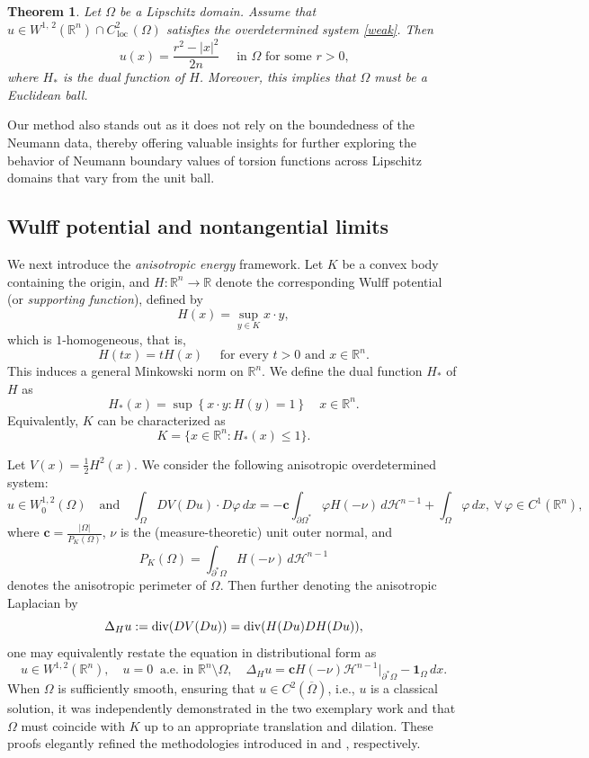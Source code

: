 \documentclass[reqno,11pt]{amsart}
\def\loc{{\mathop\mathrm{\,loc\,}}}
\newcommand{\R}{\mathbb{R}}
\newtheorem{thm}{Theorem}[section]
\numberwithin{equation}{section}
\theoremstyle{remark}
\begin{document}
\begin{thm}\label{main thm}
    Let $\Omega$ be a Lipschitz domain. 
    Assume that $u\in W^{1,\,2}(\mathbb R^n)\cap C^2_\loc(\Omega)$ satisfies the overdetermined system \eqref{weak}. Then 
    $$u(x)=\frac{r^2-|x|^2}{2n} \quad \text{ in  }  \Omega  \text{ for some $r>0$,}$$
where $H_*$ is the dual function of $H$. Moreover, this implies that $\Omega$ must be a Euclidean ball. 
\end{thm}

Our method also stands out as it does not rely on the boundedness of the Neumann data, thereby offering valuable insights for further exploring the behavior of Neumann boundary values of torsion functions across Lipschitz domains that vary from the unit ball. 

\subsection{Wulff potential and nontangential limits}

We next introduce the \emph{anisotropic energy} framework. Let $K$ be  a convex body containing the origin, and  $H\colon \mathbb R^n\to \mathbb R$ denote the corresponding Wulff potential (or \emph{supporting function}), defined by 
$$H(x)=\sup_{y\in K} x\cdot y,$$
which is $1$-homogeneous, that is,
$$H(tx)=tH(x)\quad \text{  for every $t>0$ and $x\in \mathbb R^n$} .$$
This induces a general Minkowski norm on $\mathbb R^n$. We define the dual function $H_*$ of $H$ as
$$H_*(x)= \sup\left\{x \cdot y : H(y) = 1\right\}\quad  x\in \mathbb R^n.$$
Equivalently,  $K$ can be characterized as
$$K=\{x\in \mathbb R^n\colon H_*(x)\le 1\}. $$


Let $V(x)=\frac 1 2 H^2(x)$.  We consider the following anisotropic overdetermined system:
\begin{equation*}
     u \in W^{1,2}_0(\Omega) \quad \text{and} \quad \int_{\Omega} DV(Du)\cdot D\varphi \, dx = -\mathbf{c}\int_{\partial \Omega^*} \varphi H(-\nu)\, d\mathscr{H}^{n-1} + \int_{\Omega} \varphi \, dx, \  \forall\, \varphi\in C^1(\mathbb{R}^n),
\end{equation*}
where $\mathbf c=\frac{|\Omega|}{P_K(\Omega)}$, $\nu$ is the (measure-theoretic) unit outer normal, and $$P_K(\Omega)=\int_{\partial^*\Omega} H(-\nu)\, d\mathscr H^{n-1}$$
denotes the anisotropic perimeter of $\Omega$. Then further denoting the anisotropic Laplacian by
$$\Delta_Hu:={\rm div} (DV(Du))= {\rm div} (H(Du)DH(Du)),$$
one may equivalently restate the equation in distributional form as
\begin{equation}\label{weak wulff u}
   u \in W^{1,2}(\mathbb R^n), \quad  u=0\  \text{ a.e. in }\R^n\setminus \Omega,\quad \Delta_H u=\mathbf{c}H(-\nu)\mathscr{H}^{n-1}|_{\partial^*\Omega} - \mathbf{1}_{\Omega}\,dx. 
\end{equation} 
When $\Omega$ is sufficiently smooth, ensuring that $u\in C^2(\overline{\Omega})$, i.e., $u$ is a classical solution, it was independently demonstrated in the two exemplary work \cite{CS2009} and \cite{WX2011} that $\Omega$ must coincide with $K$ up to an appropriate translation and dilation. These proofs elegantly refined the methodologies introduced in \cite{BNST2008} and \cite{W1971}, respectively.  
\end{document}
